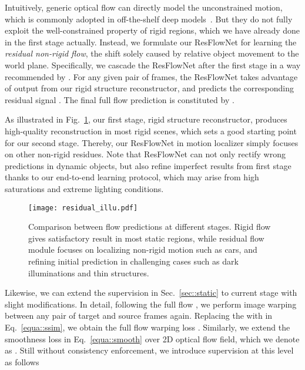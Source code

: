 Intuitively, generic optical flow can directly model the unconstrained motion, which is commonly adopted in off-the-shelf deep models~\cite{FischerDIHHGSCB15,IMKDB17}. But they do not fully exploit the well-constrained property of rigid regions, which we have already done in the first stage actually. Instead, we formulate our ResFlowNet for learning the \textit{residual non-rigid flow}, the shift solely caused by relative object movement to the world plane. Specifically, we cascade the ResFlowNet after the first stage in a way recommended by \cite{IMKDB17}. For any given pair of frames, the ResFlowNet takes advantage of output from our rigid structure reconstructor, and predicts the corresponding residual signal . The final full flow prediction  is constituted by . 

As illustrated in Fig.~\ref{fig::residual}, our first stage, rigid structure reconstructor, produces high-quality reconstruction in most rigid scenes, which sets a good starting point for our second stage. Thereby, our ResFlowNet in motion localizer simply focuses on other non-rigid residues. Note that ResFlowNet can not only rectify wrong predictions in dynamic objects, but also refine imperfect results from first stage thanks to our end-to-end learning protocol, which may arise from high saturations and extreme lighting conditions. 


\begin{figure}[t]
\begin{center}
   \texttt{[image: residual\_illu.pdf]}
\end{center}
\vspace{-1ex}
   \caption{Comparison between flow predictions at different stages. Rigid flow gives satisfactory result in most static regions, while residual flow module focuses on localizing non-rigid motion such as cars, and refining initial prediction in challenging cases such as dark illuminations and thin structures.}\vspace{-2ex}
\label{fig::residual}
\end{figure}

Likewise, we can extend the supervision in Sec.~\ref{sec::static} to current stage with slight modifications. In detail, following the full flow , we perform image warping between any pair of target and source frames again. Replacing the  with  in Eq.~\eqref{equa::ssim}, we obtain the full flow warping loss . Similarly, we extend the smoothness loss in Eq.~\eqref{equa::smooth} over 2D optical flow field, which we denote as . \iffalse
Still without consistency enforcement, we introduce supervision at this level as follows


